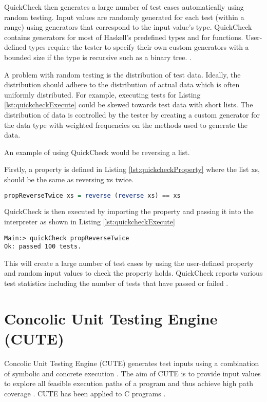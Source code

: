 QuickCheck then generates a large number of test cases automatically using random testing. Input values are randomly generated for each test (within a range) using generators that correspond to the input value's type. QuickCheck contains generators for most of Haskell's predefined types and for functions. User-defined types require the tester to specify their own custom generators with a bounded size if the type is recursive such as a binary tree. \cite{QClightweight}. 

A problem with random testing is the distribution of test data. Ideally, the distribution should adhere to the distribution of actual data which is often uniformly distributed. For example, executing tests for Listing \ref{lst:quickcheckExecute} could be skewed towards test data with short lists. The distribution of data is controlled by the tester by creating a custom generator for the data type with weighted frequencies on the methods used to generate the data.

An example of using QuickCheck would be reversing a list.

Firstly, a property is defined in Listing \ref{lst:quickcheckProperty} where the list xs, should be the same as reversing xs twice.

\begin{lstlisting}[language=haskell, label={lst:quickcheckProperty},
caption={Property for reversing a list in QuickCheck}, captionpos=b, frame = single]
propReverseTwice xs = reverse (reverse xs) == xs
\end{lstlisting}

QuickCheck is then executed by importing the property and passing it into the interpreter as shown in Listing \ref{lst:quickcheckExecute}

\begin{lstlisting}[label={lst:quickcheckExecute}, caption={Executing tests to check a list is reversed}, captionpos=b,
frame = single]
Main:> quickCheck propReverseTwice
Ok: passed 100 tests.
\end{lstlisting}

This will create a large number of test cases by using the user-defined property and random input values to check the property holds. QuickCheck reports various test statistics including the number of tests that have passed or failed \cite{QClightweight}.



\section{Concolic Unit Testing Engine (CUTE)}
Concolic Unit Testing Engine (CUTE) generates test inputs using a combination of symbolic and concrete execution \cite{CUTE}. The aim of CUTE is to provide input values to explore all feasible execution paths of a program and thus achieve high path coverage \cite{CUTE}. CUTE has been applied to C programs \cite{CUTE}.


